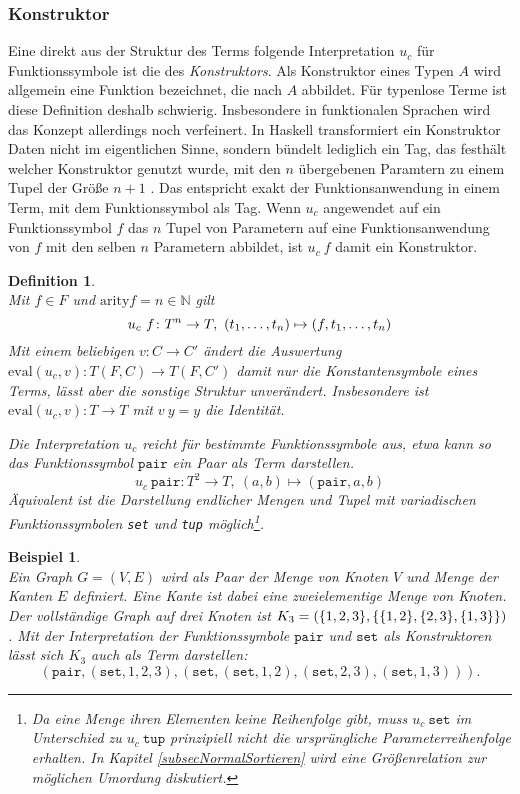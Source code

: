 \subsubsection{Konstruktor}
Eine direkt aus der Struktur des Terms folgende Interpretation $u_c$ für Funktionssymbole ist die des \emph{Konstruktors}. Als Konstruktor eines Typen $A$ wird allgemein eine Funktion bezeichnet, die nach $A$ abbildet. Für typenlose Terme ist diese Definition deshalb schwierig. Insbesondere in funktionalen Sprachen wird das Konzept allerdings noch verfeinert. In Haskell transformiert ein Konstruktor Daten nicht im eigentlichen Sinne, sondern bündelt lediglich ein Tag, das festhält welcher Konstruktor genutzt wurde, mit den $n$ übergebenen Paramtern zu einem Tupel der Größe $n+1$ \cite{haskellConstructor}. Das entspricht exakt der Funktionsanwendung in einem Term, mit dem Funktionssymbol als Tag. Wenn $u_c$ angewendet auf ein Funktionssymbol $f$ das $n$ Tupel von Parametern auf eine Funktionsanwendung von $f$ mit den selben $n$ Parametern abbildet, ist $u_c~f$ damit ein Konstruktor. 

\newtheorem{defKonstruktor}[bsp]{Definition}
\begin{defKonstruktor}~\\
 Mit $f \in F$ und $\mathrm{arity} f = n \in \mathbb N$ 
gilt 
$$u_c~f \colon T^n \rightarrow T, ~(\tOneN) \mapsto (f, \tOneN)$$
Mit einem beliebigen $v \colon C \rightarrow C'$ ändert die Auswertung $\mathrm{eval}(u_c, v) \colon T(F, C) \rightarrow T(F, C')$ damit nur die Konstantensymbole eines Terms, lässt aber die sonstige Struktur unverändert. Insbesondere ist $\mathrm{eval}(u_c, v) \colon T \rightarrow T$ mit $v~y = y$ die Identität.

Die Interpretation $u_c$ reicht für bestimmte Funktionssymbole aus, etwa kann so das Funktionssymbol $\texttt{pair}$ ein Paar als Term darstellen.
$$u_c~\texttt{pair} \colon T^2 \rightarrow T, ~(a, b) \mapsto (\texttt{pair}, a, b)$$
Äquivalent ist die Darstellung endlicher Mengen und Tupel mit variadischen Funktionssymbolen \texttt{set} und \texttt{tup} möglich\footnote{Da eine Menge ihren Elementen keine Reihenfolge gibt, muss $u_c~\texttt{set}$ im Unterschied zu $u_c~\texttt{tup}$ prinzipiell nicht die ursprüngliche Parameterreihenfolge erhalten. In Kapitel \ref{subsecNormalSortieren} wird eine Größenrelation zur möglichen Umordung diskutiert.}.
\end{defKonstruktor}


\newtheorem{bspKonstruktor}[bsp]{Beispiel}
\begin{bspKonstruktor}~\\
Ein Graph $G = (V, E)$ wird als Paar der Menge von Knoten $V$ und Menge der Kanten $E$ definiert. Eine Kante ist dabei eine zweielementige Menge von Knoten. Der vollständige Graph auf drei Knoten ist $K_3 = \paren*{\{1, 2, 3\}, \curl*{\{1, 2\}, \{2, 3\}, \{1, 3\}}}$. Mit der Interpretation der Funktionssymbole $\texttt{pair}$ und $\texttt{set}$ als Konstruktoren lässt sich $K_3$ auch als Term darstellen:
$$(\texttt{pair}, (\texttt{set}, 1, 2, 3), (\texttt{set}, (\texttt{set}, 1, 2), (\texttt{set}, 2, 3), (\texttt{set}, 1, 3))).$$
\end{bspKonstruktor}

